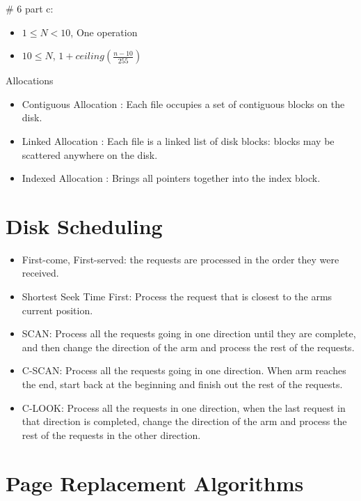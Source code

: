 \documentclass{article}
\begin{document}
\begin{multicols}{2}
    \# 6 part c:
    \begin{itemize}
      \item $1 \le N < 10$, One operation
      \item $10 \le N$, $1 + ceiling(\frac{n - 10}{255})$
    \end{itemize}

    Allocations

    \begin{itemize}
      \item Contiguous Allocation : Each file occupies a set of contiguous blocks on the disk.
      \item Linked Allocation : Each file is a linked list of disk blocks: blocks may be scattered
        anywhere on the disk.
      \item Indexed Allocation : Brings all pointers together into the index block.
    \end{itemize}

    \section*{Disk Scheduling}

    \begin{itemize}
      \item First-come, First-served: the requests are processed in the order they were received.
      \item Shortest Seek Time First: Process the request that is closest to the arms current
        position.
      \item SCAN: Process all the requests going in one direction until they are complete, and then
        change the direction of the arm and process the rest of the requests.
      \item C-SCAN: Process all the requests going in one direction. When arm reaches the end, start
        back at the beginning and finish out the rest of the requests.
      \item C-LOOK: Process all the requests in one direction, when the last request in that direction
        is completed, change the direction of the arm and process the rest of the requests in the
        other direction.
    \end{itemize}

    \section*{Page Replacement Algorithms}


\end{multicols}
\end{document}
